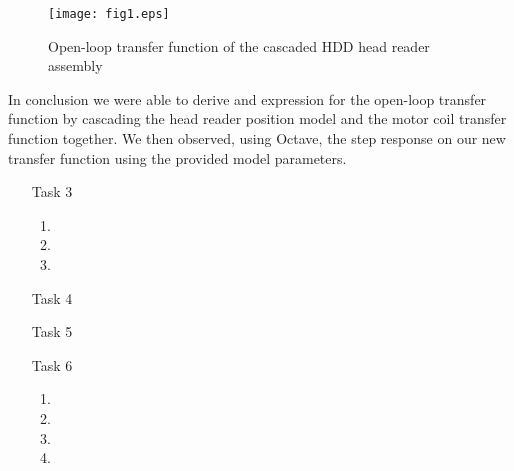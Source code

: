 \documentclass{article}
\begin{document}
	
		
	\begin{figure}[H]
		\caption{Open-loop transfer function of the cascaded HDD head reader
		assembly}
		\centering
		\texttt{[image: fig1.eps]}
	\end{figure}

	In conclusion we were able to derive and expression for the open-loop
	transfer function by cascading the head reader position model and the motor
	coil transfer function together. We then observed, using Octave, the step
	response on our new transfer function using the provided model parameters.

\begin{itemize}

\item[Task 3]

  \begin{enumerate}[A]
  \item
  \item
  \item
  \end{enumerate}

\item[Task 4]
\item[Task 5]
\item[Task 6]

  \begin{enumerate}[A]
  \item
  \item
  \item
  \item
  \end{enumerate}

\end{itemize}
\end{document}
